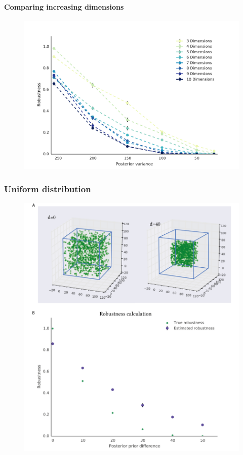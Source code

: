 \paragraph{Comparing increasing dimensions}
\begin{figure}[htbp]
\centering
\includegraphics[scale=0.6]{chapterStabilityFinder/images/robustness_s_normal_dimens.pdf}
\caption[LoF caption]{}
\label{}
\end{figure}
\clearpage
\subsubsection{Uniform distribution}
\begin{figure}[htbp]
\centering
\includegraphics[scale=0.6]{chapterStabilityFinder/images/robustness_calc_unif.png}
\caption[LoF caption]{}
\label{}
\end{figure}
\clearpage
